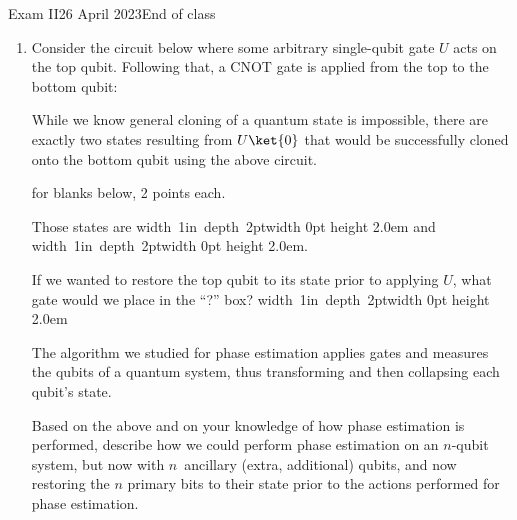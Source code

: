 \documentclass[12pt]{article}
\newcommand{\Blank}[1][1in]{\mbox{\vrule width #1 depth 2pt}\vrule width 0pt height 2.0em}
\begin{document}
\begin{assignment}{Exam II}{26 April 2023}{End of class}
\begin{enumerate}

\clearpage\item
Consider the circuit below where some arbitrary single-qubit gate $U$ acts on the top qubit.  Following that, a CNOT gate is applied from the top to the bottom qubit:




While we know general cloning of a quantum state is impossible, there are exactly two states resulting from $U\ket{0}$ that would be successfully cloned onto the bottom qubit using the above circuit.

 for blanks below, 2 points each.

Those states are \Blank{} and \Blank{}.

If we wanted to restore the top qubit to its state prior to applying $U$, what gate would we place in the ``?'' box? \Blank{}

The algorithm we studied for phase estimation applies gates and measures the qubits of a quantum system, thus transforming and then collapsing each qubit's state.

 Based on the above and on your knowledge of how phase estimation is performed, describe how we could perform phase estimation on an $n$-qubit system, but now with $n$~ancillary (extra, additional) qubits, and now restoring the $n$ primary bits to their state prior to the actions performed for phase estimation.



\end{enumerate}
\end{assignment}
\end{document}
